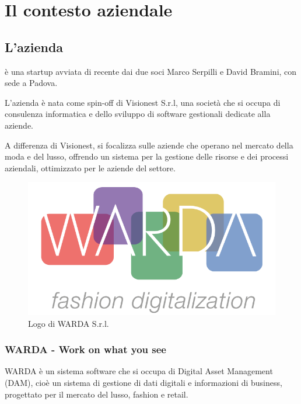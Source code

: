 
\chapter{Il contesto aziendale}
\label{cap:contesto-aziendale}

\section{L'azienda}

\myCompany è una startup avviata di recente dai due soci Marco Serpilli e David Bramini, con sede a Padova.

L'azienda è nata come spin-off di Visionest S.r.l, una società che si occupa di consulenza informatica e dello sviluppo di software gestionali dedicate alla aziende.

A differenza di Visionest, \myCompany si focalizza sulle aziende che operano nel mercato della moda e del lusso, offrendo un sistema per la gestione delle risorse e dei processi aziendali, ottimizzato per le aziende del settore.

\begin{figure}[htp]
\centering
\includegraphics[width=\textwidth/2]{../immagini/warda-logo}
\caption{Logo di WARDA S.r.l.}  
\end{figure}

\subsection{WARDA - Work on what you see}

WARDA è un sistema software che si occupa di Digital Asset Management (DAM), cioè un sistema di gestione di dati digitali e informazioni di business, progettato per il mercato del lusso, fashion e retail. 

